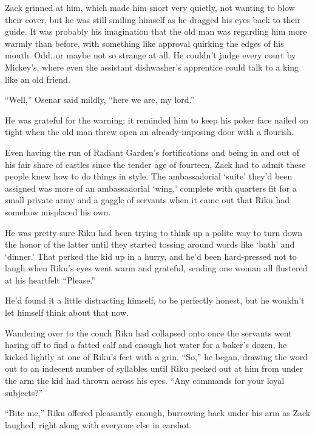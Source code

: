 Zack grinned at him, which made him snort very quietly, not wanting to blow their cover, but he was still smiling himself as he dragged his eyes back to their guide. It was probably his imagination that the old man was regarding him more warmly than before, with something like approval quirking the edges of his mouth. Odd\ldots or maybe not so strange at all. He couldn't judge every court by Mickey's, where even the assistant dishwasher's apprentice could talk to a king like an old friend.

``Well,'' Osenar said mildly, ``here we are, my lord.''

He was grateful for the warning; it reminded him to keep his poker face nailed on tight when the old man threw open an already-imposing door with a flourish.


\scenechange


Even having the run of Radiant Garden's fortifications and being in and out of his fair share of castles since the tender age of fourteen, Zack had to admit these people knew how to do things in style. The ambassadorial `suite' they'd been assigned was more of an ambassadorial `wing,' complete with quarters fit for a small private army and a gaggle of servants when it came out that Riku had somehow misplaced his own.

He was pretty sure Riku had been trying to think up a polite way to turn down the honor of the latter until they started tossing around words like `bath' and `dinner.' That perked the kid up in a hurry, and he'd been hard-pressed not to laugh when Riku's eyes went warm and grateful, sending one woman all flustered at his heartfelt ``Please.''

He'd found it a little distracting himself, to be perfectly honest, but he wouldn't let himself think about that now.

Wandering over to the couch Riku had collapsed onto once the servants went haring off to find a fatted calf and enough hot water for a baker's dozen, he kicked lightly at one of Riku's feet with a grin. ``So,'' he began, drawing the word out to an indecent number of syllables until Riku peeked out at him from under the arm the kid had thrown across his eyes. ``Any commands for your loyal subjects?''

``Bite me,'' Riku offered pleasantly enough, burrowing back under his arm as Zack laughed, right along with everyone else in earshot.

